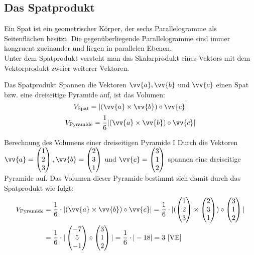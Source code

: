\subsection{Das Spatprodukt}
Ein Spat ist ein geometrischer Körper, der sechs Parallelogramme als Seitenflächen besitzt. Die gegenüberliegende Parallelogramme sind immer kongruent zueinander und liegen in parallelen Ebenen.\\
Unter dem Spatprodukt versteht man das Skalarprodukt eines Vektors mit dem Vektorprodukt zweier weiterer Vektoren.
\begin{defi}{Das Spatprodukt}{}
Spannen die Vektoren $\vv{a}, \vv{b}$ und $\vv{c}$ einen Spat bzw. eine dreiseitige Pyramide auf, ist das Volumen:
$$V_{\text{Spat}} = |(\vv{a}\times\vv{b})\circ \vv{c}|$$ $$V_{\text{Pyramide}}=\dfrac{1}{6}|(\vv{a}\times\vv{b})\circ \vv{c}| $$
\end{defi} 
\begin{bsp}{Berechnung des Volumens einer dreiseitigen Pyramide I}{}
Durch die Vektoren $\vv{a} = \begin{pmatrix} 1\\2\\3
\end{pmatrix}, \vv{b}= \begin{pmatrix}
    2\\3\\1
\end{pmatrix}$ und $\vv{c}= \begin{pmatrix}
   3\\1\\2
\end{pmatrix}$ spannen eine dreiseitige Pyramide auf. Das Volumen dieser Pyramide bestimmt sich damit durch das Spatprodukt wie folgt:
\begin{equation*}
    \begin{split}
      V_{\text{Pyramide}} &= \dfrac{1}{6} \cdot |(\vv{a}\times \vv{b})\circ \vv{c}| = \dfrac{1}{6} \cdot |(\begin{pmatrix}1\\2\\3\end{pmatrix} \times 
\begin{pmatrix} 2\\3\\1 \end{pmatrix}) \circ 
\begin{pmatrix} 3\\1\\2 \end{pmatrix}|\\
&=\dfrac{1}{6} \cdot |\begin{pmatrix} -7\\5\\-1 \end{pmatrix}\circ \begin{pmatrix} 3\\1\\2 \end{pmatrix}|  =\dfrac{1}{6} \cdot |-18| = 3\ \text{[VE]}
    \end{split}
\end{equation*}
\end{bsp}

